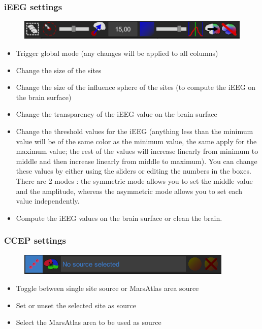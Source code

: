 \documentclass[a4paper]{article}
\begin{document}
\subsubsection{iEEG settings}
\begin{figure}[H]
\begin{center}
\includegraphics[scale=0.5]{iEEGSettings.png}
\end{center}
\end{figure}
\begin{itemize}
\item Trigger global mode (any changes will be applied to all columns)
\item Change the size of the sites
\item Change the size of the influence sphere of the sites (to compute the iEEG on the brain surface)
\item Change the transparency of the iEEG value on the brain surface
\item Change the threshold values for the iEEG (anything less than the minimum value will be of the same color as the minimum value, the same apply for the maximum value; the rest of the values will increase linearly from minimum to middle and then increase linearly from middle to maximum). You can change these values by either using the sliders or editing the numbers in the boxes. There are 2 modes : the symmetric mode allows you to set the middle value and the amplitude, whereas the asymmetric mode allows you to set each value independently.
\item Compute the iEEG values on the brain surface or clean the brain.
\end{itemize}
\subsubsection{CCEP settings}
\begin{figure}[H]
\begin{center}
\includegraphics[scale=0.5]{CCEPSettings.png}
\end{center}
\end{figure}
\begin{itemize}
\item Toggle between single site source or MarsAtlas area source
\item Set or unset the selected site as source
\item Select the MarsAtlas area to be used as source
\end{itemize}
\end{document}
